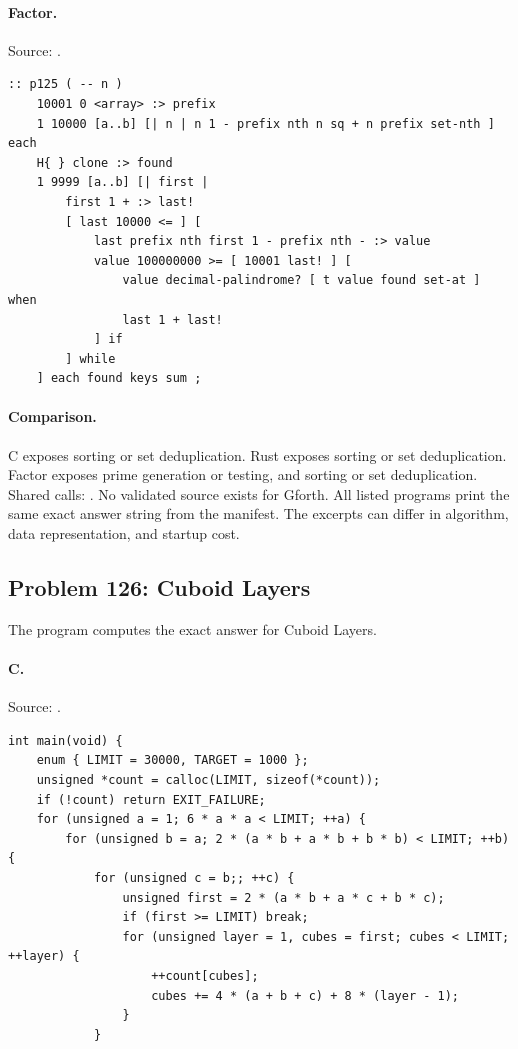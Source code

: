 \paragraph{Factor.} Source: .
\begin{lstlisting}
:: p125 ( -- n )
    10001 0 <array> :> prefix
    1 10000 [a..b] [| n | n 1 - prefix nth n sq + n prefix set-nth ] each
    H{ } clone :> found
    1 9999 [a..b] [| first |
        first 1 + :> last!
        [ last 10000 <= ] [
            last prefix nth first 1 - prefix nth - :> value
            value 100000000 >= [ 10001 last! ] [
                value decimal-palindrome? [ t value found set-at ] when
                last 1 + last!
            ] if
        ] while
    ] each found keys sum ;
\end{lstlisting}

\paragraph{Comparison.}
C exposes sorting or set deduplication. Rust exposes sorting or set deduplication. Factor exposes prime generation or testing, and sorting or set deduplication. Shared calls: \texttt{}.
No validated source exists for Gforth.
All listed programs print the same exact answer string from the manifest. The excerpts can differ in algorithm, data representation, and startup cost.

\subsection{Problem 126: Cuboid Layers}
\label{walkthrough:p126}
The program computes the exact answer for Cuboid Layers.

\paragraph{C.} Source: .
\begin{lstlisting}
int main(void) {
    enum { LIMIT = 30000, TARGET = 1000 };
    unsigned *count = calloc(LIMIT, sizeof(*count));
    if (!count) return EXIT_FAILURE;
    for (unsigned a = 1; 6 * a * a < LIMIT; ++a) {
        for (unsigned b = a; 2 * (a * b + a * b + b * b) < LIMIT; ++b) {
            for (unsigned c = b;; ++c) {
                unsigned first = 2 * (a * b + a * c + b * c);
                if (first >= LIMIT) break;
                for (unsigned layer = 1, cubes = first; cubes < LIMIT; ++layer) {
                    ++count[cubes];
                    cubes += 4 * (a + b + c) + 8 * (layer - 1);
                }
            }
\end{lstlisting}

